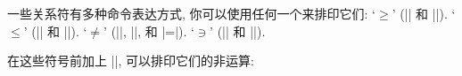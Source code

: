 一些关系符有多种命令表达方式, 你可以使用任何一个来排印它们:
\ulist \compact
\li `$\ge$' (|\ge| 和 |\geq|).
\li `$\le$' (|\le| 和 |\leq|).
\li `$\ne$' (|\ne|, |\neq|, 和 |\not=|).
\li `$\ni$' (|\ni| 和 |\owns|).
\endulist

\xrdef{\not}
在这些符号前加上 |\not|, 可以排印它们的非运算:

\nobreak
{}
\basicdisplay {$\not\asymp$}{\\not\\asymp}
\basicdisplay {$\not\cong$}{\\not\\cong}
\basicdisplay {$\not\equiv$}{\\not\\equiv}
\basicdisplay {$\not=$}{\\not=}\ttidxref{=}
\basicdisplay {$\not\ge$}{\\not\\ge}
\basicdisplay {$\not\geq$}{\\not\\geq}
\basicdisplay {$\not\le$}{\\not\\le}
\basicdisplay {$\not\leq$}{\\not\\leq}
\basicdisplay {$\not\prec$}{\\not\\prec}
\basicdisplay {$\not\preceq$}{\\not\\preceq}
\basicdisplay {$\not\succ$}{\\not\\succ}
\basicdisplay {$\not\succeq$}{\\not\\succeq}
\basicdisplay {$\not\approx$}{\\not\\approx}
\basicdisplay {$\not\sim$}{\\not\\sim}
\basicdisplay {$\not\simeq$}{\\not\\simeq}
\basicdisplay {$\not\subset$}{\\not\\subset}
\basicdisplay {$\not\subseteq$}{\\not\\subseteq}
\basicdisplay {$\not\supset$}{\\not\\supset}
\basicdisplay {$\not\supseteq$}{\\not\\supseteq}
\basicdisplay {$\not\sqsubseteq$}{\\not\\sqsubseteq}%
\basicdisplay {$\not\sqsupseteq$}{\\not\\sqsupseteq}%
\egroup

